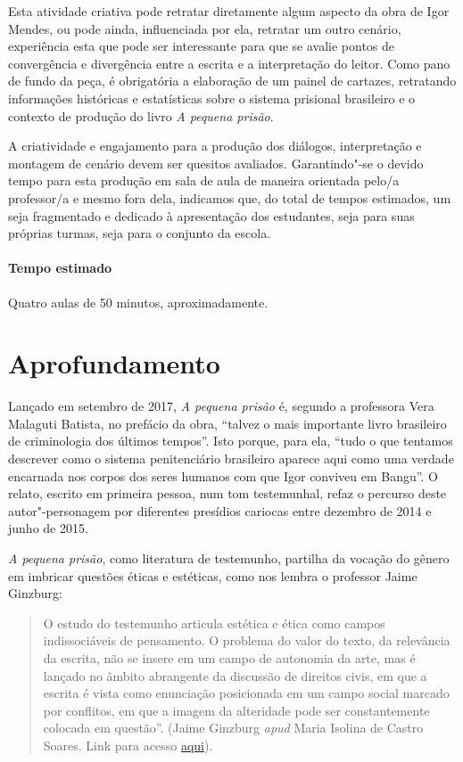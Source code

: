 \documentclass[11pt]{extarticle}
\begin{document}
\begin{enumerate}
Esta atividade criativa pode retratar diretamente algum aspecto da obra
de Igor Mendes, ou pode ainda, influenciada por ela, retratar um outro
cenário, experiência esta que pode ser interessante para que se avalie
pontos de convergência e divergência entre a escrita e a interpretação
do leitor. Como pano de fundo da peça, é obrigatória a elaboração de um
painel de cartazes, retratando informações históricas e estatísticas
sobre o sistema prisional brasileiro e o contexto de produção do livro
\emph{A pequena prisão}. 

A criatividade e engajamento para a produção
dos diálogos, interpretação e montagem de cenário devem ser quesitos
avaliados. Garantindo"-se o devido tempo para esta produção em sala de
aula de maneira orientada pelo/a professor/a e mesmo fora dela,
indicamos que, do total de tempos estimados, um seja fragmentado e
dedicado à apresentação dos estudantes, seja para suas próprias turmas,
seja para o conjunto da escola.
\end{enumerate}

\paragraph{Tempo estimado} Quatro aulas de 50 minutos, aproximadamente.


\section{Aprofundamento}

Lançado em setembro de 2017, \emph{A
pequena prisão} é, segundo a
professora Vera Malaguti Batista, no prefácio da obra, ``talvez o mais
importante livro brasileiro de criminologia dos últimos tempos''. Isto
porque, para ela, ``tudo o que tentamos descrever como o sistema
penitenciário brasileiro aparece aqui como uma verdade encarnada nos
corpos dos seres humanos com que Igor conviveu em Bangu''. O relato,
escrito em primeira pessoa, num tom testemunhal, refaz o percurso deste
autor"-personagem por diferentes presídios cariocas entre dezembro de
2014 e junho de 2015.


\emph{A
pequena prisão}, como literatura de testemunho, partilha da vocação
do gênero em imbricar questões éticas e estéticas, como nos lembra o
professor Jaime Ginzburg:

\begin{quote}
O estudo do testemunho articula estética e ética como campos
indissociáveis de pensamento. O problema do valor do texto, da
relevância da escrita, não se insere em um campo de autonomia da arte,
mas é lançado no âmbito abrangente da discussão de direitos civis, em
que a escrita é vista como enunciação posicionada em um campo social
marcado por conflitos, em que a imagem da alteridade pode ser
constantemente colocada em questão''. (Jaime Ginzburg \emph{apud}
Maria Isolina de Castro Soares. Link para acesso
\href{https://abralic.org.br/anais/arquivos/2018\_1547730007.pdf}{aqui}).
\end{quote}
\end{document}
